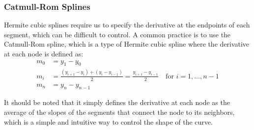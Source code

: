 \subsubsection{Catmull-Rom Splines}

Hermite cubic splines require us to specify the derivative at the endpoints of each segment, which can be difficult to control. A common practice is to use the Catmull-Rom spline, which is a type of Hermite cubic spline where the derivative at each node is defined as:
\begin{align*}
    m_0 &= y_1 - y_0 \\
    m_i &= \frac{(y_{i+1} - y_i) + (y_i - y_{i-1})}{2} = \frac{y_{i+1} - y_{i-1}}{2} \quad \text{for } i = 1, \ldots, n-1 \\
    m_{n} &= y_{n} - y_{n-1}
\end{align*}

It should be noted that it simply defines the derivative at each node as the average of the slopes of the segments that connect the node to its neighbors, which is a simple and intuitive way to control the shape of the curve.


